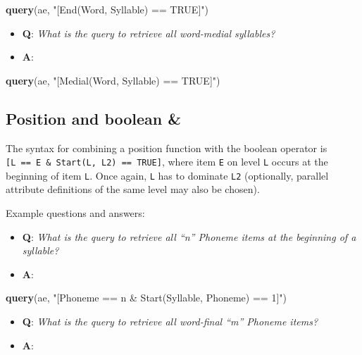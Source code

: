 \documentclass[]{book}
\newenvironment{Shaded}{\begin{snugshade}}{\end{snugshade}}
\newcommand{\KeywordTok}[1]{\textcolor[rgb]{0.13,0.29,0.53}{\textbf{#1}}}
\newcommand{\NormalTok}[1]{#1}
\newcommand{\StringTok}[1]{\textcolor[rgb]{0.31,0.60,0.02}{#1}}
\providecommand{\tightlist}{%
  \setlength{\itemsep}{0pt}\setlength{\parskip}{0pt}}
\begin{document}
\begin{Shaded}
\begin{Highlighting}[]
\KeywordTok{query}\NormalTok{(ae, }\StringTok{"[End(Word, Syllable) == TRUE]"}\NormalTok{)}
\end{Highlighting}
\end{Shaded}

\begin{itemize}
\tightlist
\item
  \textbf{Q}: \emph{What is the query to retrieve all word-medial syllables?}
\item
  \textbf{A}:
\end{itemize}

\begin{Shaded}
\begin{Highlighting}[]
\KeywordTok{query}\NormalTok{(ae, }\StringTok{"[Medial(Word, Syllable) == TRUE]"}\NormalTok{)}
\end{Highlighting}
\end{Shaded}

\hypertarget{position-and-boolean}{%
\subsection{Position and boolean \&}\label{position-and-boolean}}

The syntax for combining a position function with the boolean operator is \texttt{{[}L\ ==\ E\ \&\ Start(L,\ L2)\ ==\ TRUE{]}}, where item \texttt{E} on level \texttt{L} occurs at the beginning of item \texttt{L}. Once again, \texttt{L} has to dominate \texttt{L2} (optionally, parallel attribute definitions of the same level may also be chosen).

Example questions and answers:

\begin{itemize}
\tightlist
\item
  \textbf{Q}: \emph{What is the query to retrieve all ``n'' Phoneme items at the beginning of a syllable?}
\item
  \textbf{A}:
\end{itemize}

\begin{Shaded}
\begin{Highlighting}[]
\KeywordTok{query}\NormalTok{(ae, }\StringTok{"[Phoneme == n & Start(Syllable, Phoneme) == 1]"}\NormalTok{)}
\end{Highlighting}
\end{Shaded}

\begin{itemize}
\tightlist
\item
  \textbf{Q}: \emph{What is the query to retrieve all word-final ``m'' Phoneme items?}
\item
  \textbf{A}:
\end{itemize}
\end{document}
